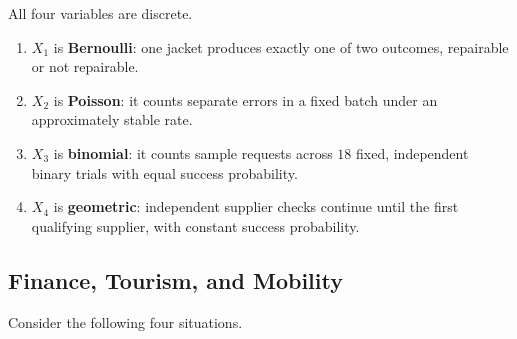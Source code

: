 	All four variables are discrete.
	\begin{enumerate}
		\item $X_1$ is \textbf{Bernoulli}: one jacket produces exactly one of two outcomes, repairable or not repairable.
		\item $X_2$ is \textbf{Poisson}: it counts separate errors in a fixed batch under an approximately stable rate.
		\item $X_3$ is \textbf{binomial}: it counts sample requests across $18$ fixed, independent binary trials with equal success probability.
		\item $X_4$ is \textbf{geometric}: independent supplier checks continue until the first qualifying supplier, with constant success probability.
	\end{enumerate}


	\subsection{Finance, Tourism, and Mobility}
	\label{sec:finance-tourism-mobility}

	Consider the following four situations.

